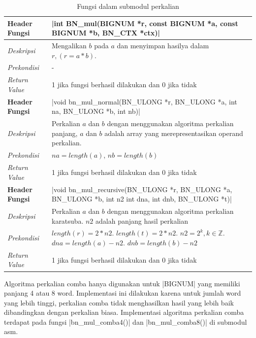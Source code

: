       \begin{table}[h]
        \caption{Fungsi dalam submodul perkalian}
        \label{tab:bn_mul}
        \begin{tabular}{R{2.8cm}L{10.5cm}}

          \toprule
          \textbf{Header Fungsi} & |int BN_mul(BIGNUM *r, const BIGNUM *a, const BIGNUM *b, BN_CTX *ctx)| \\ \midrule
          \textit{Deskripsi}     & Mengalikan $b$ pada $a$ dan menyimpan hasilya dalam $r, (r = a * b)$.\\
          \textit{Prekondisi}    & -\\
          \textit{Return Value}  & 1 jika fungsi berhasil dilakukan dan 0 jika tidak
          \\ \bottomrule

          \textbf{Header Fungsi} & |void bn_mul_normal(BN_ULONG *r, BN_ULONG *a, int na, BN_ULONG *b, int nb)| \\ \midrule
          \textit{Deskripsi}     & Perkalian $a$ dan $b$ dengan menggunakan algoritma perkalian panjang, $a$ dan $b$ adalah array yang merepresentasikan operand perkalian.  \\
          \textit{Prekondisi}    & $na = length(a)$, $nb = length(b)$ \\
          \textit{Return Value}  & 1 jika fungsi berhasil dilakukan dan 0 jika tidak
          \\ \bottomrule

          \textbf{Header Fungsi} & |void bn_mul_recursive(BN_ULONG *r, BN_ULONG *a, BN_ULONG *b, int n2 int dna, int dnb, BN_ULONG *t)| \\ \midrule
          \textit{Deskripsi}     & Perkalian $a$ dan $b$ dengan menggunakan algoritma perkalian karatsuba. $n2$ adalah panjang hasil perkalian \\
          \textit{Prekondisi}    & $length(r) = 2*n2$. $ length(t) = 2*n2$. $n2 = 2^k, k \in \mathbb{Z} $. $dna = length(a) - n2$. $dnb = length(b) - n2$ \\
          \textit{Return Value}  & 1 jika fungsi berhasil dilakukan dan 0 jika tidak
          \\ \bottomrule
        \end{tabular}
      \end{table}

      Algoritma perkalian comba hanya digunakan untuk |BIGNUM| yang memiliki panjang 4 atau 8 word. Implementasi ini dilakukan karena untuk jumlah word yang lebih tinggi, perkalian comba tidak menghasilkan hasil yang lebih baik dibandingkan dengan perkalian biasa. Implementasi algoritma perkalian comba terdapat pada fungsi |bn_mul_comba4()| dan |bn_mul_comba8()| di submodul asm.

